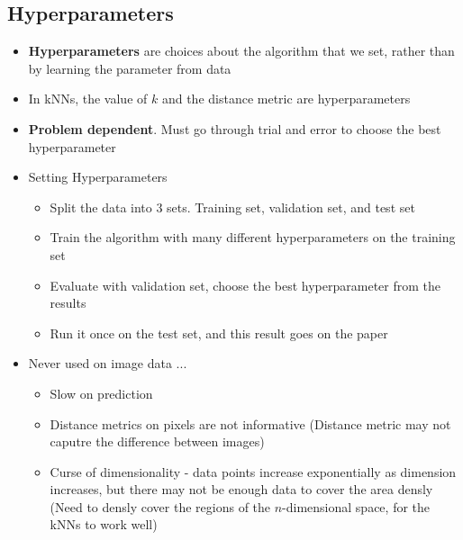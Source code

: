 \subsection{Hyperparameters}
\begin{itemize}
	\item \textbf{Hyperparameters} are choices about the algorithm that we set, rather than by learning the parameter from data
	\item In kNNs, the value of $k$ and the distance metric are hyperparameters
	\item \textbf{Problem dependent}. Must go through trial and error to choose the best hyperparameter
	\item Setting Hyperparameters
	\begin{itemize}
		\item Split the data into 3 sets. Training set, validation set, and test set
		\item Train the algorithm with many different hyperparameters on the training set
		\item Evaluate with validation set, choose the best hyperparameter from the results
		\item Run it once on the test set, and this result goes on the paper
	\end{itemize}
	\item Never used on image data ...
	\begin{itemize}
		\item Slow on prediction
		\item Distance metrics on pixels are not informative (Distance metric may not caputre the difference between images)
		\item Curse of dimensionality - data points increase exponentially as dimension increases, but there may not be enough data to cover the area densly (Need to densly cover the regions of the $n$-dimensional space, for the kNNs to work well)
	\end{itemize}
\end{itemize}

